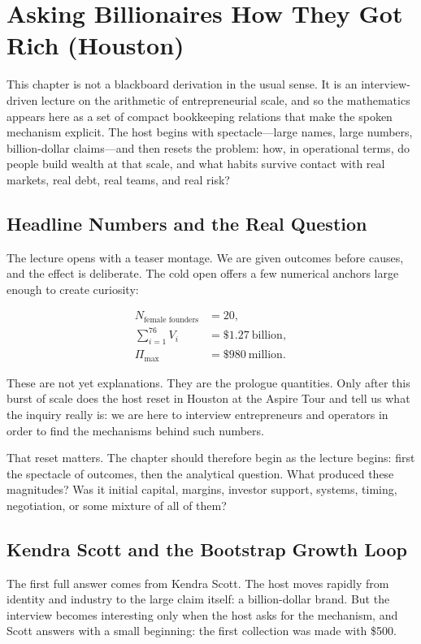\chapter{Asking Billionaires How They Got Rich (Houston)}

This chapter is not a blackboard derivation in the usual sense. It is an interview-driven lecture on the arithmetic of entrepreneurial scale, and so the mathematics appears here as a set of compact bookkeeping relations that make the spoken mechanism explicit. The host begins with spectacle---large names, large numbers, billion-dollar claims---and then resets the problem: how, in operational terms, do people build wealth at that scale, and what habits survive contact with real markets, real debt, real teams, and real risk?

\section{Headline Numbers and the Real Question}

The lecture opens with a teaser montage. We are given outcomes before causes, and the effect is deliberate. The cold open offers a few numerical anchors large enough to create curiosity:

\begin{align}
N_{\text{female founders}} &= 20,\\
\sum_{i=1}^{76} V_i &= \$1.27\ \text{billion},\\
\Pi_{\max} &= \$980\ \text{million}.
\end{align}

These are not yet explanations. They are the prologue quantities. Only after this burst of scale does the host reset in Houston at the Aspire Tour and tell us what the inquiry really is: we are here to interview entrepreneurs and operators in order to find the mechanisms behind such numbers.

That reset matters. The chapter should therefore begin as the lecture begins: first the spectacle of outcomes, then the analytical question. What produced these magnitudes? Was it initial capital, margins, investor support, systems, timing, negotiation, or some mixture of all of them?

\section{Kendra Scott and the Bootstrap Growth Loop}

The first full answer comes from Kendra Scott. The host moves rapidly from identity and industry to the large claim itself: a billion-dollar brand. But the interview becomes interesting only when the host asks for the mechanism, and Scott answers with a small beginning: the first collection was made with \$500.

